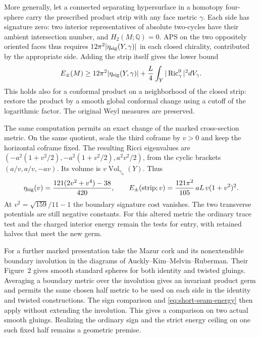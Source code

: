 More generally, let a connected separating hypersurface in a homotopy
four-sphere carry the prescribed product strip with any face metric
\(\gamma\). Each side has signature zero: two interior representatives
of absolute two-cycles have their ambient intersection number, and
\(H_2(M;\mathbb Q)=0\). APS on the two oppositely oriented faces thus
requires \(12\pi^2|\eta_{\rm sig}(Y,\gamma)|\) in each closed
chirality, contributed by the appropriate side. Adding the strip itself
gives the lower bound
\[
 E_\pm(M)\ge 12\pi^2|\eta_{\rm sig}(Y,\gamma)|
       +\frac L4\int_Y|\operatorname{Ric}^0_\gamma|^2dV_\gamma .
\]
This holds also for a conformal product on a neighborhood of the
closed strip: restore the product by a smooth global conformal change
using a cutoff of the logarithmic factor. The original Weyl measures
are preserved.

The same computation permits an exact change of the marked
cross-section metric. On the same quotient, scale the third
coframe by \(v>0\) and keep the horizontal coframe fixed.
The resulting Ricci eigenvalues are
\((-a^2(1+v^2/2),-a^2(1+v^2/2),a^2v^2/2)\), from the
cyclic brackets \((a/v,a/v,-av)\). Its volume is
\(v\operatorname{Vol}_{\gamma_a}(Y)\). Thus
\[
 \eta_{\rm sig}(v)=\frac{121(2v^2+v^4)-38}{420},\qquad
 E_\pm(\mathrm{strip};v)=\frac{121\pi^2}{105}\,aL\,v(1+v^2)^2 .
\]
At \(v^2=\sqrt{159}/11-1\) the boundary signature cost
vanishes. The two transverse potentials are still negative
constants. For this altered metric the ordinary trace test
and the charged interior energy remain the tests for entry,
with retained halves that meet the new germ.

For a further marked presentation take the Mazur cork and
its nonextendible boundary involution in the diagrams of
Auckly--Kim--Melvin--Ruberman. Their Figure~2 gives smooth
standard spheres for both identity and twisted gluings.
Averaging a boundary metric over the involution gives an
invariant product germ and permits the same chosen half
metric to be used on each side in the identity and twisted
constructions. The sign comparison and
\eqref{eq:short-seam-energy} then apply without extending the
involution. This gives a comparison on two actual smooth
gluings. Realizing the ordinary sign and the strict energy
ceiling on one such fixed half remains a geometric premise.
\cite[\S1 and Figures 1--2]{AucklyKimMelvinRuberman2017Equivariant}

